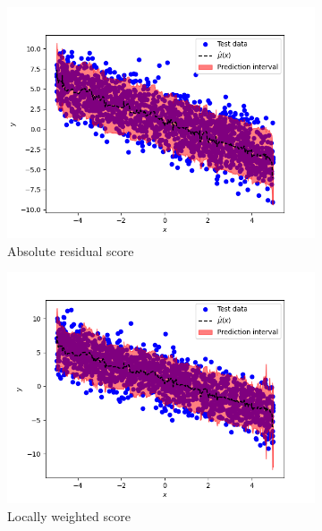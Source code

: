 \documentclass[11pt, titlepage]{article} %
\numberwithin{equation}{section}
\theoremstyle{definition}
\numberwithin{theorem}{section}
\numberwithin{lemma}{section}
\numberwithin{corollary}{section}
\numberwithin{proposition}{section}
\numberwithin{definition}{section}
\numberwithin{remark}{section}
\begin{document}
\begin{figure}[H]
    \centering
    \begin{subfigure}{0.49\textwidth}
    \includegraphics[width=\linewidth]{figures/2_4_homoscedastic_RF.png}    
    \caption{Absolute residual score} \label{fig:2_4_homoscedastic_RF}
    \end{subfigure}
    \begin{subfigure}{0.49\textwidth}
    \includegraphics[width=\linewidth]{figures/2_4_homoscedastic_LW.png}
    \caption{Locally weighted score} \label{fig:2_4_homoscedastic_LW}
    \end{subfigure}
    \begin{subfigure}{0.49\textwidth}

\end{subfigure}
\end{figure}
\end{document}
